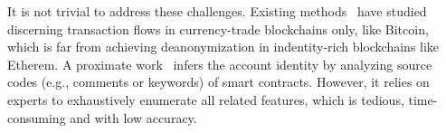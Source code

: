 It is not trivial to address these challenges. Existing methods~\cite{maesa2016analysis,ranshous2017exchange,zhao2015graph} have studied discerning transaction flows in currency-trade blockchains only, like Bitcoin, which is far from achieving deanonymization in indentity-rich blockchains like Etherem.
A proximate work~\cite{chen2018infocom} infers the account identity by analyzing source codes (e.g., comments or keywords) of smart contracts. However, it relies on experts to exhaustively enumerate all related features, which is tedious, time-consuming and with low accuracy.








